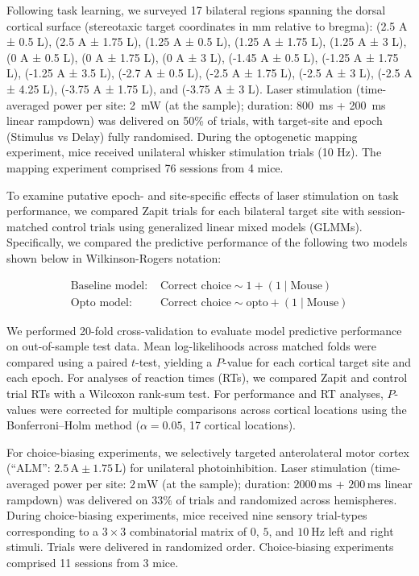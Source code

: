 \documentclass[9pt,lineno]{elife}
\begin{document}
Following task learning, we surveyed 17 bilateral regions spanning the dorsal cortical surface (stereotaxic target coordinates in mm relative to bregma): (2.5 A ± 0.5 L), (2.5 A ± 1.75 L), (1.25 A ± 0.5 L), (1.25 A ± 1.75 L), (1.25 A ± 3 L), (0 A ± 0.5 L), (0 A ± 1.75 L), (0 A ± 3 L), (-1.45 A ± 0.5 L), (-1.25 A ± 1.75 L), (-1.25 A ± 3.5 L), (-2.7 A ± 0.5 L), (-2.5 A ± 1.75 L), (-2.5 A ± 3 L), (-2.5 A ± 4.25 L), (-3.75 A ± 1.75 L), and (-3.75 A ± 3 L).
Laser stimulation (time-averaged power per site: 2~mW (at the sample); duration: 800~ms + 200~ms linear rampdown) was delivered on 50\% of trials, with target-site and epoch (Stimulus vs Delay) fully randomised.
During the optogenetic mapping experiment, mice received unilateral whisker stimulation trials (10 Hz).
The mapping experiment comprised 76 sessions from 4 mice.

To examine putative epoch- and site-specific effects of laser stimulation on task performance, we compared Zapit trials for each bilateral target site with session-matched control trials using generalized linear mixed models (GLMMs).
Specifically, we compared the predictive performance of the following two models shown below in Wilkinson-Rogers notation:

\[
\begin{aligned}
\text{Baseline model: } & \text{Correct choice} \sim 1 + (1 \mid \text{Mouse}) \\
\text{Opto model: } & \text{Correct choice} \sim \text{opto} + (1 \mid \text{Mouse})
\end{aligned}
\]

We performed 20-fold cross-validation to evaluate model predictive performance on out-of-sample test data.
Mean log-likelihoods across matched folds were compared using a paired $t$-test, yielding a $P$-value for each cortical target site and each epoch.
For analyses of reaction times (RTs), we compared Zapit and control trial RTs with a Wilcoxon rank-sum test.
For performance and RT analyses, $P$-values were corrected for multiple comparisons across cortical locations using the Bonferroni--Holm method ($\alpha = 0.05$, 17 cortical locations).

For choice-biasing experiments, we selectively targeted anterolateral motor cortex (``ALM'': $2.5\,\mathrm{A} \pm 1.75\,\mathrm{L}$) for unilateral photoinhibition.
Laser stimulation (time-averaged power per site: $2\,\mathrm{mW}$ (at the sample); duration: $2000\,\mathrm{ms}$ + $200\,\mathrm{ms}$ linear rampdown) was delivered on $33\%$ of trials and randomized across hemispheres.
During choice-biasing experiments, mice received nine sensory trial-types corresponding to a $3 \times 3$ combinatorial matrix of $0$, $5$, and $10~\mathrm{Hz}$ left and right stimuli.
Trials were delivered in randomized order.
Choice-biasing experiments comprised 11 sessions from 3 mice.
\end{document}

